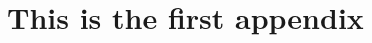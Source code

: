 \documentclass[11pt,                                          %
               a4paper,                                       %
               openright,                                     %
               twoside]{report}                               %
\begin{document}
\appendix                                                     %
\chapter{This is the first appendix}                          %




\end{document}
